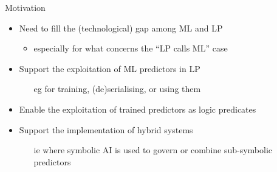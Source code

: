 \documentclass[presentation]{beamer}\mode<presentation>{\usetheme{AMSBolognaFC}}
\begin{document}
\begin{frame}[c]{Motivation}
    \begin{itemize}
        \item Need to fill the (technological) gap among ML and LP
        \begin{itemize}
            \item especially for what concerns the ``LP calls ML'' case
        \end{itemize}

        \vfill

        \item Support the exploitation of ML predictors in LP
        \begin{itemize}
            \item[eg] for training, (de)serialising, or using them
        \end{itemize}

        \vfill

        \item Enable the exploitation of trained predictors as logic predicates

        \vfill

        \item Support the implementation of hybrid systems
         \begin{itemize}
            \item[ie] where symbolic AI is used to govern or combine sub-symbolic predictors
        \end{itemize}

    \end{itemize}
\end{frame}
\end{document}

